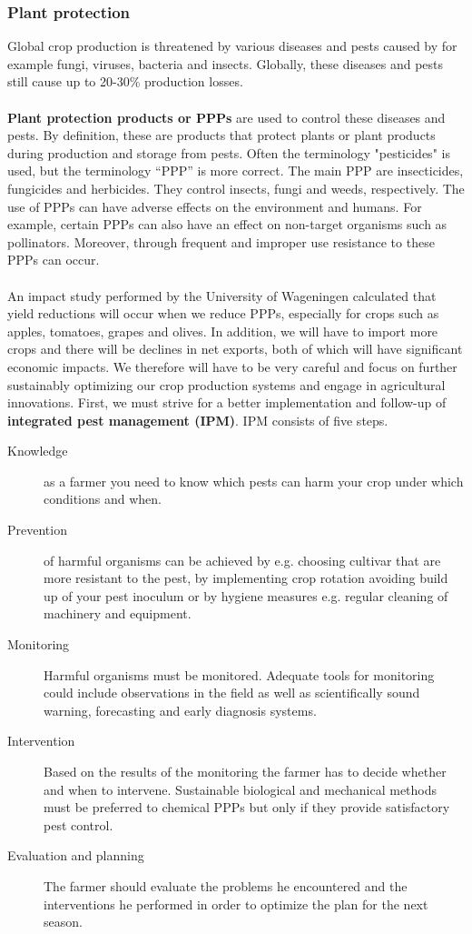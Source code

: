 \documentclass[../summary.tex]{subfiles}
\begin{document}
	\subsubsection{Plant protection}
	
	Global crop production is threatened by various diseases and pests caused by for example fungi, viruses, bacteria and insects. Globally, these diseases and pests still cause up to 20-30\% production losses. 
	\\\\
	\textbf{Plant protection products or PPPs} are used to control these diseases and pests. By definition, these are products that protect plants or plant products during production and storage from pests. Often the terminology "pesticides" is used, but the terminology “PPP” is more correct. The main PPP are insecticides, fungicides and herbicides. They control insects, fungi and weeds, respectively. The use of PPPs can have adverse effects on the environment and humans. For example, certain PPPs can also have an effect on non-target organisms such as pollinators. Moreover, through frequent and improper use resistance to these PPPs can occur. 
	\\\\
	An impact study performed by the University of Wageningen calculated that yield reductions will occur when we reduce PPPs, especially for crops such as apples, tomatoes, grapes and olives. In addition, we will have to import more crops and there will be declines in net exports, both of which will have significant economic impacts. We therefore will have to be very careful and focus on further sustainably optimizing our crop production systems and engage in agricultural innovations. First, we must strive for a better implementation and follow-up of \textbf{integrated pest management (IPM)}. IPM consists of five steps.
	
	\begin{description}
		\item[Knowledge] as a farmer you need to know which pests can harm your crop under which conditions and when.
		\item[ Prevention] of harmful organisms can be achieved by e.g. choosing cultivar that are more resistant to the pest, by implementing crop rotation avoiding build up of your pest inoculum or by hygiene measures e.g. regular cleaning of machinery and equipment.
		\item[Monitoring] Harmful organisms must be monitored. Adequate tools for monitoring could include observations in the field as well as scientifically sound warning, forecasting and early diagnosis systems.
		\item[Intervention] Based on the results of the monitoring the farmer has to decide whether and when to intervene. Sustainable biological and mechanical methods must be preferred to chemical PPPs but only if they provide satisfactory pest control.
		\item[Evaluation and planning] The farmer should evaluate the problems he encountered and the interventions he performed in order to optimize the plan for the next season. 
	\end{description}
	
\end{document}
